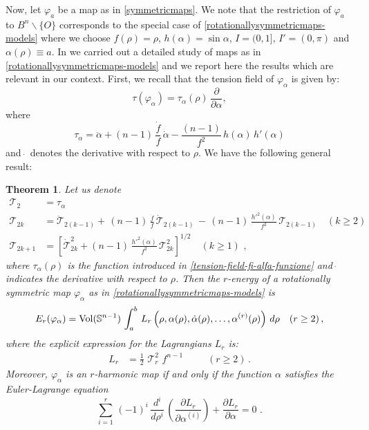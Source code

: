 \documentclass[11pt]{amsart}
\theoremstyle{plain}
\newtheorem{theorem}                {Theorem}      [section]
\theoremstyle{definition}
\numberwithin{equation}{section}
\def \s{{\mathbb S}}
\numberwithin{equation}{section}
\begin{document}
Now, let $\varphi_a$ be a map as in \eqref{symmetricmaps}. We note that the restriction of $\varphi_a$ to $B^n \backslash \{ O\}$ corresponds to the special case of \eqref{rotationallysymmetricmaps-models} where we choose $f(\rho)=\rho$, $h(\alpha)= \sin \alpha$, $I=(0,1]$, $I'=(0,\pi)$ and $\alpha(\rho)\equiv a$. In \cite{BMOR1} we carried out a detailed study of maps as in \eqref{rotationallysymmetricmaps-models} and we report here the results which are relevant in our context. First, we recall that the tension field of $\varphi_{\alpha}$ is given by:
\begin{equation}\label{tension-field-fi-alfa}
\tau \left (\varphi_{\alpha}\right )= \tau_\alpha (\rho)\, \frac{\partial}{\partial \alpha},
\end{equation}
where
\begin{equation}\label{tension-field-fi-alfa-funzione}
\tau_\alpha =\ddot{\alpha} +(n-1)\, \frac{\dot{f}}{f}\,\dot{\alpha}-\frac{(n-1)}{f^2}\, h(\alpha)\,h'(\alpha)
\end{equation}
and $\dot{\;}$ denotes the derivative with respect to $\rho$. We have the following general result:
\begin{theorem}\label{theorem-r-energy}
\cite{BMOR1} Let us denote
\begin{equation}\label{assumptions-recursivity}
\begin{split}
\mathcal{T}_2&= \tau_{\alpha}  \\
\mathcal{T}_{2k}&= \ddot{\mathcal{T}}_{2(k-1)}+\,(n-1) \,\frac{\dot{f}}{f}\,\dot{\mathcal{T}}_{2(k-1)}\, -\,(n-1)\,\frac{h'^2( \alpha)}{f^2}\,\mathcal{T}_{2(k-1)}  \quad ( k \geq 2)\\ 
\mathcal{T}_{2k+1}&=\left [\dot{\mathcal{T}}_{2k}^2+(n-1) \,\frac{h'^2( \alpha)}{f^2}\, \mathcal{T}_{2k}^2\right ]^{1/2} \quad (k \geq 1)\,\,,
\end{split}
\end{equation}
where $\tau_{\alpha}(\rho)$ is the function introduced in \eqref{tension-field-fi-alfa-funzione} and $\dot{\;}$ indicates the derivative with respect to $\rho$. Then the $r$-energy of a rotationally symmetric map $\varphi_{\alpha}$ as in \eqref{rotationallysymmetricmaps-models} is
\begin{equation}\label{r-energy-rot-symm-maps-Lagrangian}
E_r(\varphi_\alpha)={\rm Vol}(\s^{n-1})\,\int_a^b\,L_r\left(\rho, \alpha(\rho), \dot{\alpha}(\rho),\ldots, \alpha^{(r)}(\rho)\right) \, d\rho \quad (r \geq 2) \,,
\end{equation}
where the explicit expression for the Lagrangians $L_r$ is:
\begin{align}\label{r-energy-explicit-rot-maps}
L_r &=  \frac{1}{2}\,\,\mathcal{T}_{r}^2\, \,f^{n-1}\,  \,\, \quad \quad (r \geq 2) \,.
\end{align}
Moreover, $\varphi_\alpha$ is an $r$-harmonic map if and only if the function $\alpha$ satisfies the Euler-Lagrange equation
\begin{equation}\label{Euler-lagrange-generale}
\sum_{i=1}^r \, (-1)^i \, \frac{d^i}{d\rho^i}\,\left( \frac{\partial L_r}{\partial \alpha^{(i)}}\right)+\frac{\partial L_r}{\partial \alpha}=0 \,\,.
\end{equation}
\end{theorem}
\end{document}

